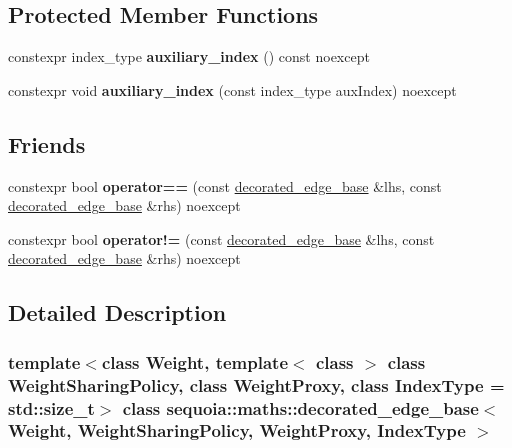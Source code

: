 \subsection*{Protected Member Functions}
\begin{DoxyCompactItemize}
\item 
\mbox{\label{classsequoia_1_1maths_1_1decorated__edge__base_afa337aded4fd35eac07a38fb688835e6}} 
constexpr index\+\_\+type {\bfseries auxiliary\+\_\+index} () const noexcept
\item 
\mbox{\label{classsequoia_1_1maths_1_1decorated__edge__base_a91a61276be7f46f2daee30e24d836521}} 
constexpr void {\bfseries auxiliary\+\_\+index} (const index\+\_\+type aux\+Index) noexcept
\end{DoxyCompactItemize}
\subsection*{Friends}
\begin{DoxyCompactItemize}
\item 
\mbox{\label{classsequoia_1_1maths_1_1decorated__edge__base_a7d249df886a2874e315e77f7bbbdc1d9}} 
constexpr bool {\bfseries operator==} (const \mbox{\hyperlink{classsequoia_1_1maths_1_1decorated__edge__base}{decorated\+\_\+edge\+\_\+base}} \&lhs, const \mbox{\hyperlink{classsequoia_1_1maths_1_1decorated__edge__base}{decorated\+\_\+edge\+\_\+base}} \&rhs) noexcept
\item 
\mbox{\label{classsequoia_1_1maths_1_1decorated__edge__base_abaab7d065842d621a187940c28faebb7}} 
constexpr bool {\bfseries operator!=} (const \mbox{\hyperlink{classsequoia_1_1maths_1_1decorated__edge__base}{decorated\+\_\+edge\+\_\+base}} \&lhs, const \mbox{\hyperlink{classsequoia_1_1maths_1_1decorated__edge__base}{decorated\+\_\+edge\+\_\+base}} \&rhs) noexcept
\end{DoxyCompactItemize}


\subsection{Detailed Description}
\subsubsection*{template$<$class Weight, template$<$ class $>$ class Weight\+Sharing\+Policy, class Weight\+Proxy, class Index\+Type = std\+::size\+\_\+t$>$\newline
class sequoia\+::maths\+::decorated\+\_\+edge\+\_\+base$<$ Weight, Weight\+Sharing\+Policy, Weight\+Proxy, Index\+Type $>$}

